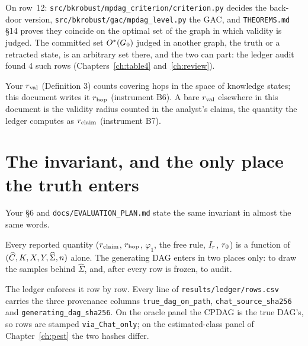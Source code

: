 On row~12: \texttt{src/\allowbreak bkrobust/\allowbreak mpdag\_criterion/\allowbreak criterion.py} decides the back-door version,
\texttt{src/\allowbreak bkrobust/\allowbreak gac/\allowbreak mpdag\_level.py} the GAC, and \texttt{THEOREMS.md} §14 proves they coincide on
the optimal set of the graph in which validity is judged. The committed set $O^{*}(G_0)$ judged in
another graph, the truth or a retracted state, is an arbitrary set there, and the two can part:
the ledger audit found 4 such rows (Chapters~\ref{ch:table4} and~\ref{ch:review}).

%
{Your $r_{\mathrm{val}}$ (Definition 3) counts covering hops in the space of knowledge states; this document writes
it $r_{\mathrm{hop}}$ (instrument B6). A bare $r_{\mathrm{val}}$ elsewhere in this document is the validity radius counted in the
analyst's claims, the quantity the ledger computes as $r_{\mathrm{claim}}$ (instrument B7).}

\begin{antes}
\end{antes}

\section{The invariant, and the only place the truth enters}

Your \S6 and \texttt{docs/\allowbreak EVALUATION\_PLAN.md} state the same invariant in almost the same words.

\begin{formulabox}
Every reported quantity ($r_{\mathrm{claim}}$, $r_{\mathrm{hop}}$, $\varphi_1$, the free rule, $I_{r}$, $r_{0}$) is a
function of $(\widehat{C}, K, X, Y, \widehat\Sigma, n)$ alone. The generating DAG enters in two places
only: to draw the samples behind $\widehat\Sigma$, and, after every row is frozen, to audit.
\end{formulabox}

{\sloppy The ledger enforces it row by row. Every line of \texttt{results/\allowbreak ledger/\allowbreak rows.csv} carries the
three provenance columns \texttt{true\_dag\_on\_path}, \texttt{chat\_source\_sha256} and
\texttt{generating\_dag\_sha256}. On the oracle panel the CPDAG is the true DAG's, so rows are stamped
\texttt{via\_Chat\_only}; on the estimated-class panel of Chapter~\ref{ch:pest} the two hashes
differ.\par}

